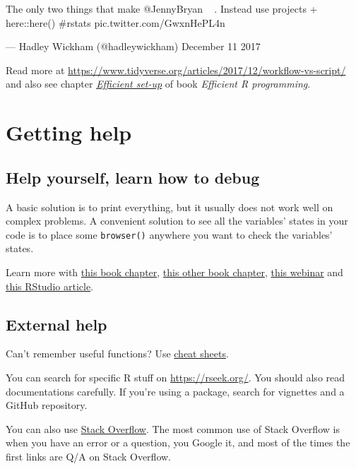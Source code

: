 \documentclass[]{book}
\theoremstyle{definition}
\theoremstyle{definition}
\theoremstyle{definition}
\theoremstyle{remark}
\begin{document}
The only two things that make @JennyBryan 😤😠🤯. Instead use projects +
here::here() \#rstats pic.twitter.com/GwxnHePL4n

--- Hadley Wickham (@hadleywickham) December 11 2017

Read more at
\url{https://www.tidyverse.org/articles/2017/12/workflow-vs-script/} and
also see chapter
\href{https://bookdown.org/csgillespie/efficientR/set-up.html}{\emph{Efficient
set-up}} of book \emph{Efficient R programming}.

\hypertarget{getting-help}{%
\section{Getting help}\label{getting-help}}

\hypertarget{help-yourself-learn-how-to-debug}{%
\subsection{Help yourself, learn how to
debug}\label{help-yourself-learn-how-to-debug}}

A basic solution is to print everything, but it usually does not work
well on complex problems. A convenient solution to see all the
variables' states in your code is to place some \texttt{browser()}
anywhere you want to check the variables' states.

Learn more with
\href{https://bookdown.org/rdpeng/rprogdatascience/debugging.html}{this
book chapter},
\href{http://adv-r.had.co.nz/Exceptions-Debugging.html}{this other book
chapter},
\href{https://www.rstudio.com/resources/videos/debugging-techniques-in-rstudio/}{this
webinar} and
\href{https://support.rstudio.com/hc/en-us/articles/205612627-Debugging-with-RStudio}{this
RStudio article}.

\hypertarget{external-help}{%
\subsection{External help}\label{external-help}}

Can't remember useful functions? Use
\href{https://www.rstudio.com/resources/cheatsheets/}{cheat sheets}.

You can search for specific R stuff on \url{https://rseek.org/}. You
should also read documentations carefully. If you're using a package,
search for vignettes and a GitHub repository.

You can also use \href{https://stackoverflow.com/}{Stack Overflow}. The
most common use of Stack Overflow is when you have an error or a
question, you Google it, and most of the times the first links are Q/A
on Stack Overflow.
\end{document}
